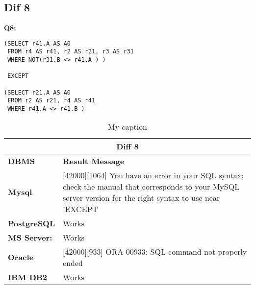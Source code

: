 \subsection{Dif 8}
  
\begin{mdframed}[backgroundcolor=lightgray!20] 
\textbf{Q8:}
\begin{lstlisting}
(SELECT r41.A AS A0
 FROM r4 AS r41, r2 AS r21, r3 AS r31
 WHERE NOT(r31.B <> r41.A ) )
 
 EXCEPT
 
(SELECT r21.A AS A0
 FROM r2 AS r21, r4 AS r41
 WHERE r41.A <> r41.B )
\end{lstlisting}
\end{mdframed}

\begin{table}[h]
\centering
\caption{My caption}
\label{my-label}
\begin{tabular}{|l|l|}
\hline
\multicolumn{2}{|c|}{\textbf{Diff 8}}                                                                                                                                                                                                   \\ \hline
\textbf{DBMS}                              & \textbf{Result Message}                                                                                                                                                                    \\ \hline
{\color[HTML]{333333} \textbf{Mysql}}      & {\color[HTML]{333333} {[}42000{]}{[}1064{]} You have an error in your SQL syntax; check the manual that corresponds to your MySQL server version for the right syntax to use near 'EXCEPT} \\ \hline
{\color[HTML]{333333} \textbf{PostgreSQL}} & {\color[HTML]{333333} Works}                                                                                                                                                               \\ \hline
{\color[HTML]{333333} \textbf{MS Server:}} & {\color[HTML]{333333} Works}                                                                                                                                                               \\ \hline
\textbf{Oracle}                            & {[}42000{]}{[}933{]} ORA-00933: SQL command not properly ended                                                                                                                             \\ \hline
\textbf{IBM DB2}                           & Works                                                                                                                                                                                      \\ \hline
\end{tabular}
\end{table}


